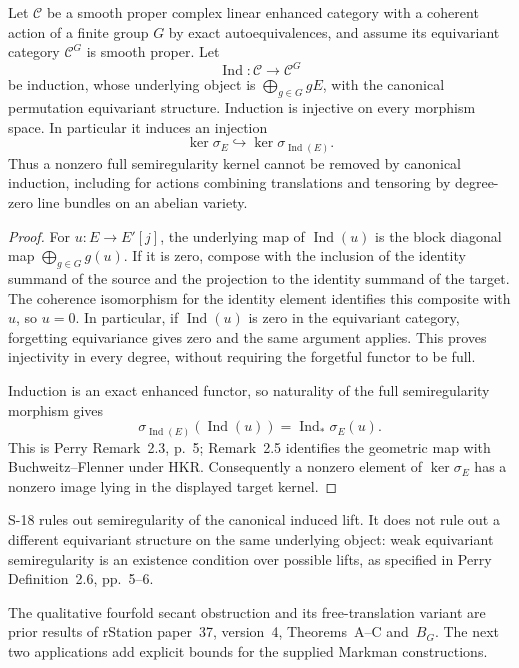 \begin{proposition}
\label{prop:semireg-induction-kernel}
Let $\mathcal C$ be a smooth proper complex linear enhanced
category with a coherent action of a finite group $G$ by exact
autoequivalences, and assume its equivariant category
$\mathcal C^G$ is smooth proper. Let
\[
 \operatorname{Ind}:\mathcal C\longrightarrow\mathcal C^G
\]
be induction, whose underlying object is
$\bigoplus_{g\in G}gE$, with the canonical permutation
equivariant structure. Induction is injective on every morphism
space. In particular it induces an injection
\[
 \ker\sigma_E\hookrightarrow
       \ker\sigma_{\operatorname{Ind}(E)}.
\]
Thus a nonzero full semiregularity kernel cannot be removed by
canonical induction, including for actions combining
translations and tensoring by degree-zero line bundles on an
abelian variety.
\end{proposition}
\begin{proof}
For $u:E\to E'[j]$, the underlying map of
$\operatorname{Ind}(u)$ is the block diagonal map
$\bigoplus_{g\in G}g(u)$.
If it is zero, compose with the inclusion of the identity
summand of the source and the projection to the identity
summand of the target. The coherence isomorphism for the
identity element identifies this composite with $u$, so $u=0$.
In particular, if $\operatorname{Ind}(u)$ is zero in the
equivariant category, forgetting equivariance gives zero and
the same argument applies. This proves injectivity in every
degree, without requiring the forgetful functor to be full.

Induction is an exact enhanced functor, so naturality of the
full semiregularity morphism gives
\[
 \sigma_{\operatorname{Ind}(E)}(\operatorname{Ind}(u))
       =\operatorname{Ind}_*\sigma_E(u).
\]
This is Perry Remark~2.3, p.~5; Remark~2.5 identifies the
geometric map with Buchweitz--Flenner under HKR.
Consequently a nonzero element of $\ker\sigma_E$ has a
nonzero image lying in the displayed target kernel.
\end{proof}

S-18 rules out semiregularity of the canonical induced lift.
It does not rule out a different equivariant structure on the
same underlying object: weak equivariant semiregularity is
an existence condition over possible lifts, as specified in
Perry Definition~2.6, pp.~5--6.

The qualitative fourfold secant obstruction and its free-translation
variant are prior results of rStation paper~37, version~4,
Theorems~A--C and~$B_G$. The next two applications add
explicit bounds for the supplied Markman constructions.


